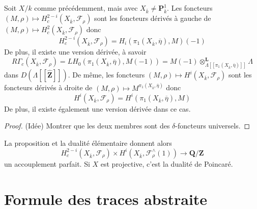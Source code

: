 \begin{proposition}
\label{proposition-curve-kpi1}
Soit $X/k$ comme précédemment, mais avec $X_{\overline{k}}\neq \mathbf{P}^1_{\overline{k}}$.
Les foncteurs
$
(M, \rho)\mapsto H_c^{2-i}(X_{\overline{k}}, \mathcal{F}_\rho)
$
sont les foncteurs dérivés à gauche de
$(M, \rho)\mapsto H_c^2(X_{\overline{k}}, \mathcal{F}_\rho)$
donc
$$
H_c^{2-i}(X_{\overline{k}}, \mathcal{F}_\rho) =
H_i(\pi_1(X_{\overline{k}}, \overline \eta), M)(-1)
$$
De plus, il existe une version dérivée, à savoir
$$
R\Gamma_c(X_{\overline{k}}, \mathcal{F}_\rho)
=
LH_0(\pi_1(X_{\overline{k}}, \overline \eta), M(-1))
=
M(-1)
\otimes_{\Lambda[[\pi_1(X_{\overline{k}}, \overline \eta)]]}^\mathbf{L}
\Lambda
$$
dans $D(\Lambda[[\widehat{\mathbf{Z}}]])$.
De même, les foncteurs
$(M, \rho)\mapsto H^i(X_{\overline{k}}, \mathcal{F}_\rho)$
sont les foncteurs dérivés à droite de
$(M, \rho)\mapsto M^{\pi_1(X_{\overline{k}}, \overline \eta)}$
donc
$$
H^i(X_{\overline{k}}, \mathcal{F}_\rho) =
H^i(\pi_1(X_{\overline{k}}, \overline \eta), M)
$$
De plus, il existe également une version dérivée dans ce cas.
\end{proposition}

\begin{proof}
(Idée) Montrer que les deux membres sont des $\delta$-foncteurs universels.
\end{proof}

\begin{remark}
\label{remark-poincare-groups}
La proposition et la dualité élémentaire donnent alors
$$
H^{2-i}_c(X_{\overline{k}}, \mathcal{F}_\rho)
\times
H^i(X_{\overline{k}}, \mathcal{F}_\rho^\wedge(1))
\to
\mathbf{Q}/\mathbf{Z}
$$
un accouplement parfait. Si $X$ est projective, c'est la dualité de Poincaré.
\end{remark}





\section{Formule des traces abstraite}
\label{section-abstract-trace-formula}


